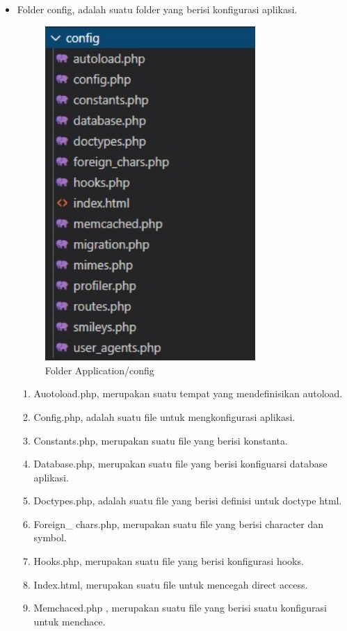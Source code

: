 \begin{itemize}
\begin{itemize}
\begin{itemize}
			\item Folder config, adalah suatu folder yang berisi konfigurasi aplikasi. 
			\begin{figure}[H]
				\includegraphics[width=8cm]{figures/instalasi/ci7.jpg}
				\centering
				\caption{Folder Application/config}
			\end{figure}	
			\begin{enumerate}
				\item Auotoload.php, merupakan suatu tempat yang mendefinisikan autoload.
				\item Config.php, adalah suatu file untuk mengkonfigurasi aplikasi.
				\item Constants.php, merupakan suatu file yang berisi konstanta.
				\item Database.php, merupakan suatu file yang berisi konfiguarsi database aplikasi.
				\item Doctypes.php, adalah suatu file yang berisi definisi untuk doctype html.
				\item Foreign\_ chars.php, merupakan suatu file yang berisi character dan symbol.
				\item Hooks.php, merupakan suatu file yang berisi konfigurasi hooks.
				\item Index.html, merupakan suatu file untuk mencegah direct access.
				\item Memchaced.php , merupakan suatu file yang berisi suatu konfigurasi untuk menchace.

\end{enumerate}
\end{itemize}
\end{itemize}
\end{itemize}
